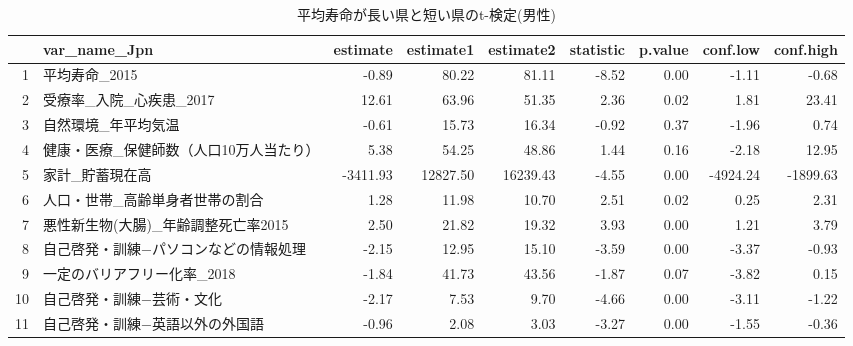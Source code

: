 \begin{table}[ht]
\centering
\caption{平均寿命が長い県と短い県のt-検定(男性)}
\label{LE_Ttest_d_m.tex}
\begingroup\tiny

\begin{adjustbox}{width=.5\textwidth}
\begin{tabular}{rlrrrrrrr}
  \hline
 & var\_name\_Jpn & estimate & estimate1 & estimate2 & statistic & p.value & conf.low & conf.high \\
  \hline
1 & 平均寿命\_2015 & -0.89 & 80.22 & 81.11 & -8.52 & 0.00 & -1.11 & -0.68 \\
  2 & 受療率\_入院\_心疾患\_2017 & 12.61 & 63.96 & 51.35 & 2.36 & 0.02 & 1.81 & 23.41 \\
  3 & 自然環境\_年平均気温 & -0.61 & 15.73 & 16.34 & -0.92 & 0.37 & -1.96 & 0.74 \\
  4 & 健康・医療\_保健師数（人口10万人当たり） & 5.38 & 54.25 & 48.86 & 1.44 & 0.16 & -2.18 & 12.95 \\
  5 & 家計\_貯蓄現在高 & -3411.93 & 12827.50 & 16239.43 & -4.55 & 0.00 & -4924.24 & -1899.63 \\
  6 & 人口・世帯\_高齢単身者世帯の割合 & 1.28 & 11.98 & 10.70 & 2.51 & 0.02 & 0.25 & 2.31 \\
  7 & 悪性新生物(大腸)\_年齢調整死亡率2015 & 2.50 & 21.82 & 19.32 & 3.93 & 0.00 & 1.21 & 3.79 \\
  8 & 自己啓発・訓練−パソコンなどの情報処理 & -2.15 & 12.95 & 15.10 & -3.59 & 0.00 & -3.37 & -0.93 \\
  9 & 一定のバリアフリー化率\_2018 & -1.84 & 41.73 & 43.56 & -1.87 & 0.07 & -3.82 & 0.15 \\
  10 & 自己啓発・訓練−芸術・文化 & -2.17 & 7.53 & 9.70 & -4.66 & 0.00 & -3.11 & -1.22 \\
  11 & 自己啓発・訓練−英語以外の外国語 & -0.96 & 2.08 & 3.03 & -3.27 & 0.00 & -1.55 & -0.36 \\
   \hline
\end{tabular}
\end{adjustbox}

\endgroup
\end{table}
